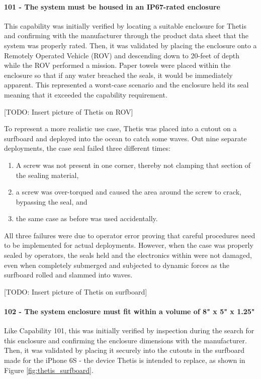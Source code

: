 \paragraph*{101 - The system must be housed in an IP67-rated enclosure} This capability was initially verified by locating a suitable enclosure for Thetis and confirming with the manufacturer through the product data sheet that the system was properly rated.
Then, it was validated by placing the enclosure onto a Remotely Operated Vehicle (ROV) and descending down to 20-feet of depth while the ROV performed a mission.
Paper towels were placed within the enclosure so that if any water breached the seals, it would be immediately apparent.
This represented a worst-case scenario and the enclosure held its seal meaning that it exceeded the capability requirement.

[TODO: Insert picture of Thetis on ROV]

To represent a more realistic use case, Thetis was placed into a cutout on a surfboard and deployed into the ocean to catch some waves.
Out nine separate deployments, the case seal failed three different times:

\begin{enumerate}
    \item A screw was not present in one corner, thereby not clamping that section of the sealing material, 
    \item a screw was over-torqued and caused the area around the screw to crack, bypassing the seal, and 
    \item the same case as before was used accidentally.
\end{enumerate}

All three failures were due to operator error proving that careful procedures need to be implemented for actual deployments.
However, when the case was properly sealed by operators, the seals held and the electronics within were not damaged, even when completely submerged and subjected to dynamic forces as the surfboard rolled and slammed into waves.

[TODO: Insert picture of Thetis on surfboard]

\paragraph*{102 - The system enclosure must fit within a volume of 8" x 5" x 1.25"} Like Capability 101, this was initially verified by inspection during the search for this enclosure and confirming the enclosure dimensions with the manufacturer.
Then, it was validated by placing it securely into the cutouts in the surfboard made for the iPhone 6S - the device Thetis is intended to replace, as shown in Figure \ref{fig:thetis_surfboard}.

